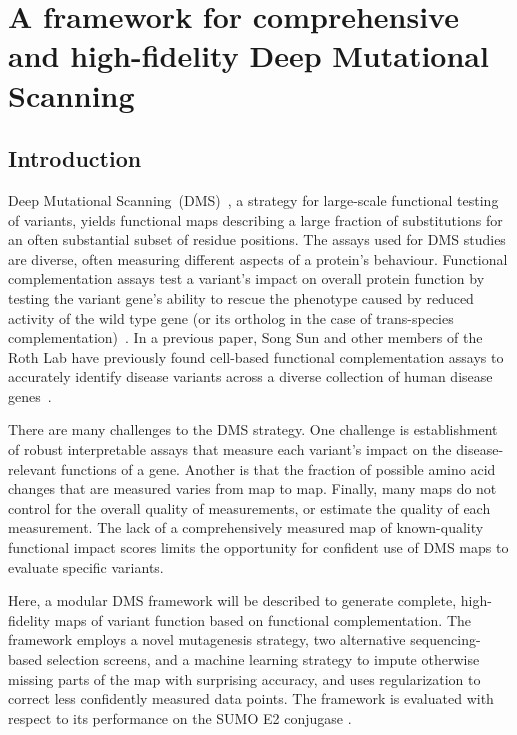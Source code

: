 

\chapter[A comprehensive high-fidelity DMS framework]{A framework for comprehensive and high-fidelity Deep Mutational Scanning}
\label{ch:data1}

\section{Introduction}


Deep Mutational Scanning~(DMS)~\cite{fowler_high-resolution_2010}, a strategy for large-scale functional testing of variants, yields functional maps describing a large fraction of substitutions for an often substantial subset of residue positions. The assays used for DMS studies are diverse, often measuring different aspects of a protein's behaviour. Functional complementation assays test a variant's impact on overall protein function by testing the variant gene's ability to rescue the phenotype caused by reduced activity of the wild type gene (or its ortholog in the case of trans-species complementation)~\cite{lee_complementation_1987,osborn_rescuing_2007}. In a previous paper, Song Sun and other members of the Roth Lab have previously found cell-based functional complementation assays to accurately identify disease variants across a diverse collection of human disease genes~\cite{sun_extended_2016}. 

There are many challenges to the DMS strategy.  One challenge is establishment of robust interpretable assays that measure each variant's impact on the disease-relevant functions of a gene. Another is that the fraction of possible amino acid changes that are measured varies from map to map. Finally, many maps do not control for the overall quality of measurements, or estimate the quality of each measurement. The lack of a comprehensively measured map of known-quality functional impact scores limits the opportunity for confident use of DMS maps to evaluate specific variants.

Here, a modular DMS framework will be described to generate complete, high-fidelity maps of variant function based on functional complementation. The framework employs a novel mutagenesis strategy, two alternative sequencing-based selection screens, and a machine learning strategy to impute  otherwise missing parts of the map with surprising accuracy, and uses regularization to correct less confidently measured data points. The framework is evaluated with respect to its performance on the SUMO E2 conjugase .

